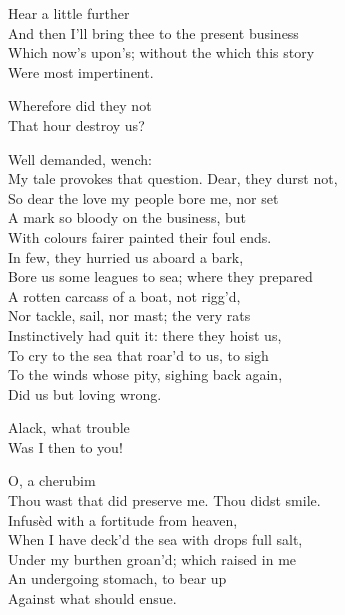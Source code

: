 \begin{verse_speech}[Prospero] 
Hear a little further\\
And then I'll bring thee to the present business\\
Which now's upon's; without the which this story\\
Were most impertinent.
\end{verse_speech}

\begin{verse_speech}[Miranda] 
Wherefore did they not\\
That hour destroy us?
\end{verse_speech}

\begin{verse_speech}[Prospero] 
Well demanded, wench:\\
My tale provokes that question. Dear, they durst not,\\
So dear the love my people bore me, nor set\\
A mark so bloody on the business, but\\
With colours fairer painted their foul ends.\\
In few, they hurried us aboard a bark,\\
Bore us some leagues to sea; where they prepared\\
A rotten carcass of a boat, not rigg'd,\\
Nor tackle, sail, nor mast; the very rats\\
Instinctively had quit it: there they hoist us,\\
To cry to the sea that roar'd to us, to sigh\\
To the winds whose pity, sighing back again,\\
Did us but loving wrong.
\end{verse_speech}

\begin{verse_speech}[Miranda] 
Alack, what trouble\\
Was I then to you!
\end{verse_speech}

\begin{verse_speech}[Prospero] 
O, a cherubim\\
Thou wast that did preserve me. Thou didst smile.\\
Infusèd with a fortitude from heaven,\\
When I have deck'd the sea with drops full salt,\\
Under my burthen groan'd; which raised in me\\
An undergoing stomach, to bear up\\
Against what should ensue.
\end{verse_speech}

